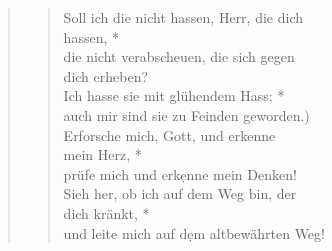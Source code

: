 \begin{quote}
\begin{verse}
Soll ich die nicht hassen, Herr, die dich\\ \vin hassen, *\\ \vin
die nicht verabscheuen, die sich gegen\\ \vin dich erheben?\\
Ich hasse sie mit glühendem Hass; *\\
auch mir sind sie zu Feinden geworden.)\\ \vin
Erforsche mich, Gott, und erkenne\\ \vin mein Herz, *\\ \vin 
prüfe mich und erk\d enne mein Denken! \\
Sieh her, ob ich auf dem Weg bin, der \\ dich kränkt, *\\
und leite mich auf d\d em altbewährten Weg! 

\end{verse}

\end{quote}

\vspace{0.3cm}

\def\greinitialformat#1{{\fontsize{40}{40}\selectfont #1}}
\gresetfirstlineaboveinitial{\small \textcolor{red}{Ps 140}}{}
\setaboveinitialseparation{0.72mm}


\vspace{0.3cm}

